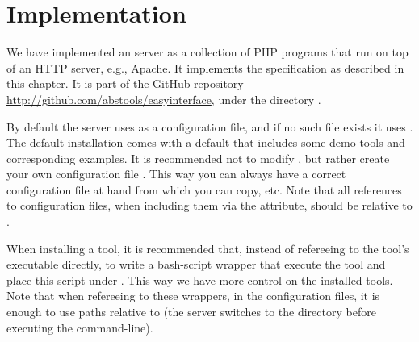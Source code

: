 \section{Implementation}
\label{sec:server:impl}

We have implemented an \ei server as a collection of PHP programs that
run on top of an HTTP server, e.g., Apache. 
%
It implements the specification as described in this chapter. It is
part of the GitHub repository
\url{http://github.com/abstools/easyinterface}, under the directory
.

By default the server uses 
as a configuration file, and if no such file exists it uses
.
%
The default installation comes with a default
 that includes some
demo tools and corresponding examples.
%
It is recommended not to modify
, but rather create
your own configuration file
. This way you can always
have a correct configuration file at hand from which you can copy,
etc.
%
Note that all references to configuration files, when including them
via the  attribute, should be relative to
.

When installing a tool, it is recommended that, instead of refereeing
to the tool's executable directly, to write a bash-script wrapper that
execute the tool and place this script under
. This way we have more control on the
installed tools.
%
Note that when refereeing to these wrappers, in the configuration
files, it is enough to use paths relative to 
(the server switches to the directory  before
executing the command-line).

